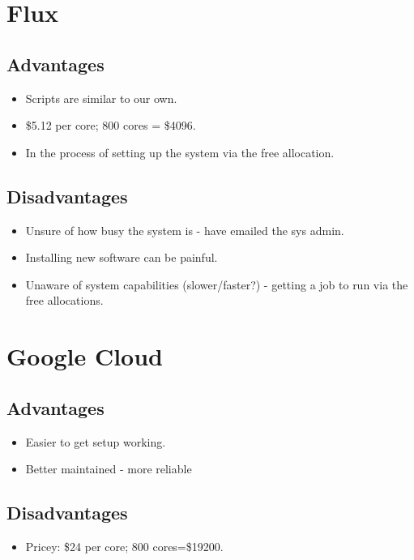 \section{Flux}
\subsection{Advantages}
\begin{itemize}
    \item Scripts are similar to our own.
    \item \$5.12 per core; 800 cores = \$4096.
    \item In the process of setting up the system via the free allocation. 
\end{itemize}
\subsection{Disadvantages}
\begin{itemize}
    \item Unsure of how busy the system is - have emailed the sys admin.
    \item Installing new software can be painful.
    \item Unaware of system capabilities (slower/faster?) - getting a job to run via the free allocations. 
\end{itemize}

\section{Google Cloud}
\subsection{Advantages}
\begin{itemize}
    \item Easier to get setup working. 
    \item Better maintained - more reliable 
\end{itemize}
\subsection{Disadvantages}
\begin{itemize}
    \item Pricey: \$24 per core; 800 cores=\$19200.
\end{itemize}

